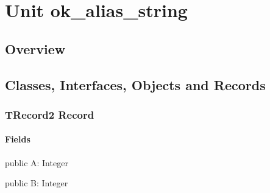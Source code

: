 \documentclass{report}
\newif\ifpdf
\begin{document}
\label{toc}\tableofcontents
\newpage
\newlength{\tmplength}
\chapter{Unit ok{\_}alias{\_}string}
\label{ok_alias_string}
\section{Overview}
\begin{description}
\item[\texttt{\begin{ttfamily}TRecord2\end{ttfamily} Record}]
\end{description}
\section{Classes, Interfaces, Objects and Records}
\ifpdf
\subsection*{\large{\textbf{TRecord2 Record}}\normalsize\hspace{1ex}\hrulefill}
\else
\subsection*{TRecord2 Record}
\fi
\label{ok_alias_string.TRecord2}
\subsubsection*{\large{\textbf{Fields}}\normalsize\hspace{1ex}\hfill}
\begin{list}{}{
\setlength{\itemindent}{0cm}
\setlength{\listparindent}{0cm}
\setlength{\leftmargin}{\evensidemargin}
\addtolength{\leftmargin}{\tmplength}
\settowidth{\labelsep}{X}
\addtolength{\leftmargin}{\labelsep}
\setlength{\labelwidth}{\tmplength}
}
\label{ok_alias_string.TRecord2-A}
\item[\textbf{A}\hfill]
\ifpdf
\begin{flushleft}
\fi
\begin{ttfamily}
public A: Integer \end{ttfamily}

\ifpdf
\end{flushleft}
\fi


\par  \label{ok_alias_string.TRecord2-B}
\item[\textbf{B}\hfill]
\ifpdf
\begin{flushleft}
\fi
\begin{ttfamily}
public B: Integer \end{ttfamily}

\ifpdf
\end{flushleft}
\fi


\par  \end{list}
\end{document}
